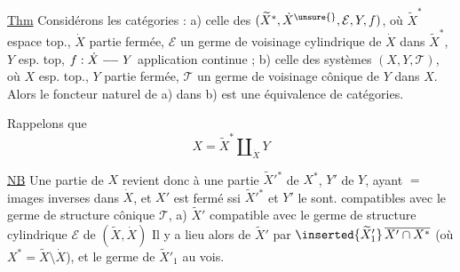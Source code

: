 \uline{Thm} Considérons les  catégories  :
a) celle des 
$(\widetilde X^*,\dot X^{\unsure{}},\mathcal E,Y,f)$, où
$\widetilde X^*$ espace top., $\dot X$ partie fermée, $\mathcal E$ un germe
de voisinage cylindrique de $\dot X$ dans $\widetilde X^*$,
$Y$ esp. top, $f:\dot X\mathrel{\relbar\joinrel\relbar}Y$ application continue ;
b) celle des systèmes $(X,Y,\mathcal T)$, où
$X$ esp. top., $Y$ partie fermée, $\mathcal T$ un germe
de voisinage cônique de $Y$ dans $X$. 
 Alors le foncteur naturel  de a)
dans b) est une équivalence de catégories.


Rappelons que
\[
X=\widetilde X^*\amalg_{\dot X}Y
\]

\uline{NB} Une partie  de $X$ revient donc à une
partie $\widetilde X'^*$ de $X^*$, $Y'$ de $Y$, ayant $=$
images inverses dans $\dot X$, et $X'$ est fermé ssi
$\widetilde X'^*$ et $Y'$ le sont. 
compatibles avec le germe de structure
cônique $\mathcal T$, 
a) $\widetilde X'$ compatible avec le germe de structure
cylindrique $\mathcal E$ de $(\widetilde X,\dot X)$
Il y a lieu alors de  $\widetilde X'$ par
$\inserted{\widetilde X'_1}\,\overline{X'\cap X^*}$
(où $X^*=\widetilde X\setminus\dot X$), et le germe de $\widetilde X'_1$ au vois.
